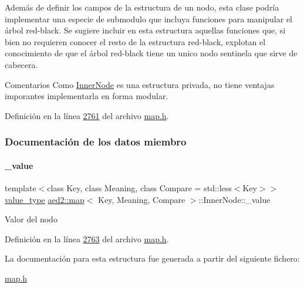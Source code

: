 Además de definir los campos de la estructura de un nodo, esta clase podría implementar una especie de submodulo que incluya funciones para manipular el árbol red-\/black. Se sugiere incluir en esta estructura aquellas funciones que, si bien no requieren conocer el resto de la estructura red-\/black, explotan el conocimiento de que el árbol red-\/black tiene un unico nodo sentinela que sirve de cabecera.

\begin{DoxyRemark}{Comentarios}
Como \hyperlink{structaed2_1_1map_1_1InnerNode}{Inner\+Node} es una estructura privada, no tiene ventajas imporantes implementarla en forma modular. 
\end{DoxyRemark}


Definición en la línea \hyperlink{map_8h_source_l02761}{2761} del archivo \hyperlink{map_8h_source}{map.\+h}.



\subsubsection{Documentación de los datos miembro}
\mbox{\label{structaed2_1_1map_1_1InnerNode_a53fd8a50986fec67601dd77c44c1657e_a53fd8a50986fec67601dd77c44c1657e}} 
\paragraph{\texorpdfstring{\+\_\+value}{\_value}}
{\footnotesize\ttfamily template$<$class Key, class Meaning, class Compare = std\+::less$<$\+Key$>$$>$ \\
\hyperlink{classaed2_1_1map_a719db98e0ff9a837610f76be33264680_a719db98e0ff9a837610f76be33264680}{value\+\_\+type} \hyperlink{classaed2_1_1map}{aed2\+::map}$<$ Key, Meaning, Compare $>$\+::Inner\+Node\+::\+\_\+value}

Valor del nodo 

Definición en la línea \hyperlink{map_8h_source_l02763}{2763} del archivo \hyperlink{map_8h_source}{map.\+h}.



La documentación para esta estructura fue generada a partir del siguiente fichero\+:\begin{DoxyCompactItemize}
\item 
\hyperlink{map_8h}{map.\+h}\end{DoxyCompactItemize}
